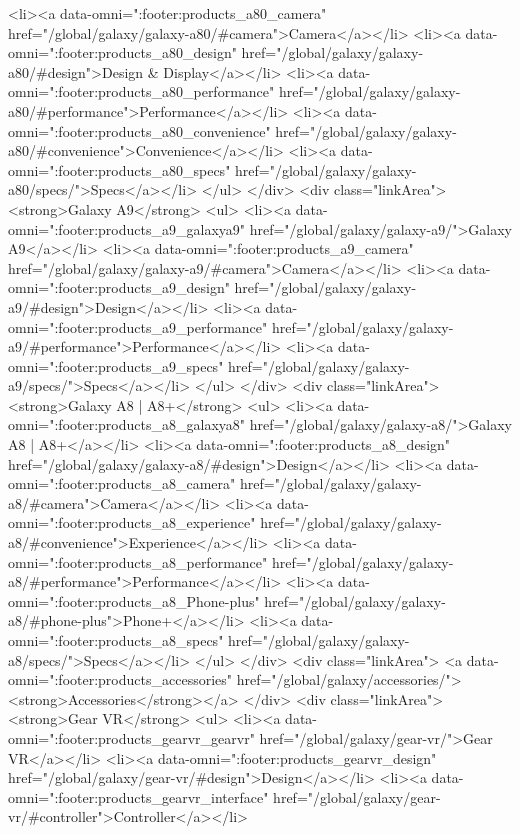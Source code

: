 {{{{{{{{{{{{{{{{{{{{{{{{{{{{{{{{{{{{{{{{{{{{{{{{{{{{{				<li><a data-omni=":footer:products_a80_camera" href="/global/galaxy/galaxy-a80/#camera">Camera</a></li>
				<li><a data-omni=":footer:products_a80_design" href="/global/galaxy/galaxy-a80/#design">Design & Display</a></li>
				<li><a data-omni=":footer:products_a80_performance" href="/global/galaxy/galaxy-a80/#performance">Performance</a></li>
				<li><a data-omni=":footer:products_a80_convenience" href="/global/galaxy/galaxy-a80/#convenience">Convenience</a></li>
				<li><a data-omni=":footer:products_a80_specs" href="/global/galaxy/galaxy-a80/specs/">Specs</a></li>
			</ul>
		</div>
		<div class="linkArea">
			<strong>Galaxy A9</strong>
			<ul>
				<li><a data-omni=":footer:products_a9_galaxya9" href="/global/galaxy/galaxy-a9/">Galaxy A9</a></li>
				<li><a data-omni=":footer:products_a9_camera" href="/global/galaxy/galaxy-a9/#camera">Camera</a></li>
				<li><a data-omni=":footer:products_a9_design" href="/global/galaxy/galaxy-a9/#design">Design</a></li>
				<li><a data-omni=":footer:products_a9_performance" href="/global/galaxy/galaxy-a9/#performance">Performance</a></li>
				<li><a data-omni=":footer:products_a9_specs" href="/global/galaxy/galaxy-a9/specs/">Specs</a></li>
			</ul>
		</div>
		<div class="linkArea">
			<strong>Galaxy A8 | A8+</strong>
			<ul>
				<li><a data-omni=":footer:products_a8_galaxya8" href="/global/galaxy/galaxy-a8/">Galaxy A8 | A8+</a></li>
				<li><a data-omni=":footer:products_a8_design" href="/global/galaxy/galaxy-a8/#design">Design</a></li>
				<li><a data-omni=":footer:products_a8_camera" href="/global/galaxy/galaxy-a8/#camera">Camera</a></li>
				<li><a data-omni=":footer:products_a8_experience" href="/global/galaxy/galaxy-a8/#convenience">Experience</a></li>
				<li><a data-omni=":footer:products_a8_performance" href="/global/galaxy/galaxy-a8/#performance">Performance</a></li>
				<li><a data-omni=":footer:products_a8_Phone-plus" href="/global/galaxy/galaxy-a8/#phone-plus">Phone+</a></li>
				<li><a data-omni=":footer:products_a8_specs" href="/global/galaxy/galaxy-a8/specs/">Specs</a></li>
			</ul>
		</div>
		<div class="linkArea">
				<a data-omni=":footer:products_accessories" href="/global/galaxy/accessories/"><strong>Accessories</strong></a>
		</div>
		<div class="linkArea">
			<strong>Gear VR</strong>
			<ul>
				<li><a data-omni=":footer:products_gearvr_gearvr" href="/global/galaxy/gear-vr/">Gear VR</a></li>
				<li><a data-omni=":footer:products_gearvr_design" href="/global/galaxy/gear-vr/#design">Design</a></li>
				<li><a data-omni=":footer:products_gearvr_interface" href="/global/galaxy/gear-vr/#controller">Controller</a></li>
}}}}}}}}}}}}}}}}}}}}}}}}}}}}}}}}}}}}}}}}}}}}}}}}}}}}}
